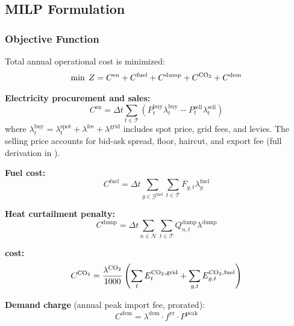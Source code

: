 \documentclass[review,3p]{elsarticle}
\begin{document}
\subsection{MILP Formulation}
\label{sec:milp}

\subsubsection{Objective Function}

Total annual operational cost is minimized:
\begin{equation}
\min \; Z = C^{\mathrm{en}} + C^{\mathrm{fuel}}
+ C^{\mathrm{dump}} + C^{\ce{CO2}} + C^{\mathrm{dem}}
\label{eq:objective}
\end{equation}

\textbf{Electricity procurement and sales:}
\begin{equation}
C^{\mathrm{en}} = \Delta t \sum_{t \in \mathcal{T}} \left(
P_t^{\mathrm{buy}} \lambda_t^{\mathrm{buy}}
- P_t^{\mathrm{sell}} \lambda_t^{\mathrm{sell}} \right)
\label{eq:cost_energy}
\end{equation}
where $\lambda_t^{\mathrm{buy}} = \lambda_t^{\mathrm{spot}}
+ \lambda^{\mathrm{fee}} + \lambda^{\mathrm{grid}}$ includes spot
price, grid fees, and levies. The selling price accounts for bid-ask
spread, floor, haircut, and export fee (full derivation in
).

\textbf{Fuel cost:}
\begin{equation}
C^{\mathrm{fuel}} = \Delta t \sum_{g \in \mathcal{G}^{\mathrm{fuel}}}
\sum_{t \in \mathcal{T}} F_{g,t} \lambda_g^{\mathrm{fuel}}
\label{eq:cost_fuel}
\end{equation}

\textbf{Heat curtailment penalty:}
\begin{equation}
C^{\mathrm{dump}} = \Delta t \sum_{n \in \mathcal{N}}
\sum_{t \in \mathcal{T}} Q_{n,t}^{\mathrm{dump}} \lambda^{\mathrm{dump}}
\label{eq:cost_dump}
\end{equation}

\textbf{ cost:}
\begin{equation}
C^{\ce{CO2}} = \frac{\lambda^{\ce{CO2}}}{1000} \left(
\sum_{t} E_t^{\ce{CO2},\mathrm{grid}}
+ \sum_{g,t} E_{g,t}^{\ce{CO2},\mathrm{fuel}} \right)
\label{eq:cost_co2}
\end{equation}

\textbf{Demand charge} (annual peak import fee, prorated):
\begin{equation}
C^{\mathrm{dem}} = \lambda^{\mathrm{dem}} \cdot f^{\mathrm{yr}}
\cdot P^{\mathrm{peak}}
\label{eq:cost_demand}
\end{equation}
\end{document}
